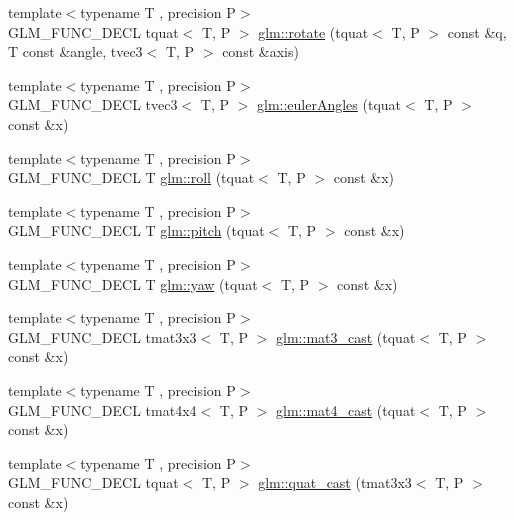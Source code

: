 \begin{DoxyCompactItemize}
\item 
{\footnotesize template$<$typename T , precision P$>$ }\\G\-L\-M\-\_\-\-F\-U\-N\-C\-\_\-\-D\-E\-C\-L tquat$<$ T, P $>$ \hyperlink{group__gtc__quaternion_gaa8f42979c921e450ff2812fb43c25702}{glm\-::rotate} (tquat$<$ T, P $>$ const \&q, T const \&angle, tvec3$<$ T, P $>$ const \&axis)
\item 
{\footnotesize template$<$typename T , precision P$>$ }\\G\-L\-M\-\_\-\-F\-U\-N\-C\-\_\-\-D\-E\-C\-L tvec3$<$ T, P $>$ \hyperlink{group__gtc__quaternion_gadb92ec1c1b0dd6b024176a73fbef3e64}{glm\-::euler\-Angles} (tquat$<$ T, P $>$ const \&x)
\item 
{\footnotesize template$<$typename T , precision P$>$ }\\G\-L\-M\-\_\-\-F\-U\-N\-C\-\_\-\-D\-E\-C\-L T \hyperlink{group__gtc__quaternion_ga4fd705376c6c1fd667be0055a0ea58ec}{glm\-::roll} (tquat$<$ T, P $>$ const \&x)
\item 
{\footnotesize template$<$typename T , precision P$>$ }\\G\-L\-M\-\_\-\-F\-U\-N\-C\-\_\-\-D\-E\-C\-L T \hyperlink{group__gtc__quaternion_ga2c08b93a4261c10748fd4d2104346f17}{glm\-::pitch} (tquat$<$ T, P $>$ const \&x)
\item 
{\footnotesize template$<$typename T , precision P$>$ }\\G\-L\-M\-\_\-\-F\-U\-N\-C\-\_\-\-D\-E\-C\-L T \hyperlink{group__gtc__quaternion_ga724a5df282b70cec0a6cb0d6dcddb6d6}{glm\-::yaw} (tquat$<$ T, P $>$ const \&x)
\item 
{\footnotesize template$<$typename T , precision P$>$ }\\G\-L\-M\-\_\-\-F\-U\-N\-C\-\_\-\-D\-E\-C\-L tmat3x3$<$ T, P $>$ \hyperlink{group__gtc__quaternion_gae04c39422eb4e450ec8c4f45a1057b40}{glm\-::mat3\-\_\-cast} (tquat$<$ T, P $>$ const \&x)
\item 
{\footnotesize template$<$typename T , precision P$>$ }\\G\-L\-M\-\_\-\-F\-U\-N\-C\-\_\-\-D\-E\-C\-L tmat4x4$<$ T, P $>$ \hyperlink{group__gtc__quaternion_ga14bb2ddf028c91542763eb6f2bba47ef}{glm\-::mat4\-\_\-cast} (tquat$<$ T, P $>$ const \&x)
\item 
{\footnotesize template$<$typename T , precision P$>$ }\\G\-L\-M\-\_\-\-F\-U\-N\-C\-\_\-\-D\-E\-C\-L tquat$<$ T, P $>$ \hyperlink{group__gtc__quaternion_ga950f8acff3e33bbda77895a3dcb7e5ce}{glm\-::quat\-\_\-cast} (tmat3x3$<$ T, P $>$ const \&x)

\end{DoxyCompactItemize}
